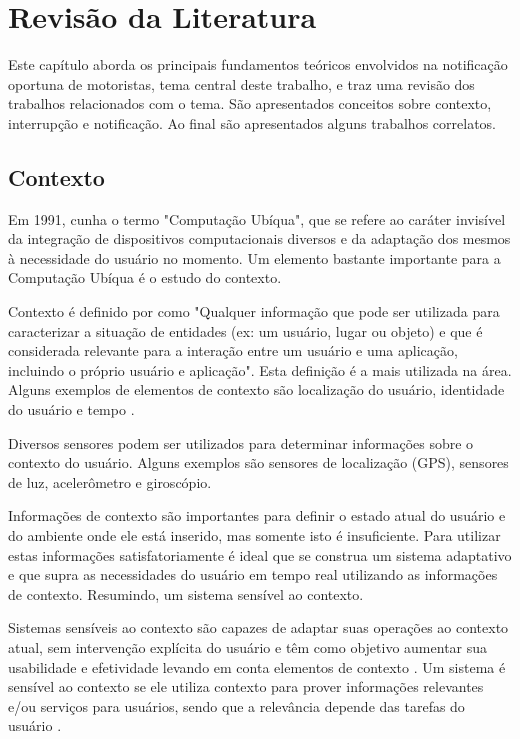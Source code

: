 
\chapter{Revisão da Literatura}
\label{revisao-lit}
Este capítulo aborda os principais fundamentos teóricos envolvidos na notificação oportuna de motoristas,
tema central deste trabalho, e traz uma revisão dos trabalhos relacionados com o tema. São apresentados
conceitos sobre contexto, interrupção e notificação. Ao final são apresentados alguns trabalhos correlatos.

\section{Contexto}
\label{contexto}
Em 1991, \cite{weiser1991computer} cunha o termo "Computação Ubíqua", que se refere ao caráter invisível da
integração de dispositivos computacionais diversos e da adaptação dos mesmos à necessidade do usuário no momento.
Um elemento bastante importante para a Computação Ubíqua é o estudo do contexto.

Contexto é definido por \cite{dey2001understanding} como "Qualquer informação que pode ser utilizada para
caracterizar a situação de entidades (ex: um usuário, lugar ou objeto) e que é considerada relevante para
a interação entre um usuário e uma aplicação, incluindo o próprio usuário e aplicação". Esta definição é
a mais utilizada na área. Alguns exemplos de elementos de contexto são
localização do usuário, identidade do usuário e tempo \cite{ryan1999enhanced}.

Diversos sensores podem ser utilizados para determinar informações sobre o contexto do usuário. Alguns exemplos são
sensores de localização (GPS), sensores de luz, acelerômetro e giroscópio.

Informações de contexto são importantes para definir o estado atual do usuário e do ambiente onde ele está inserido,
mas somente isto é insuficiente. Para utilizar estas informações satisfatoriamente é ideal que se construa um sistema
adaptativo e que supra as necessidades do usuário em tempo real utilizando as informações de contexto. Resumindo,
um sistema sensível ao contexto.

Sistemas sensíveis ao contexto são capazes de adaptar suas operações ao contexto atual, sem intervenção
explícita do usuário e têm como objetivo aumentar sua usabilidade e efetividade levando em conta elementos
de contexto \cite{baldauf2007survey}.  Um sistema é sensível ao contexto se ele utiliza contexto para prover
informações relevantes e/ou serviços para usuários, sendo que a relevância depende das tarefas do usuário
\cite{abowd1999towards}.

